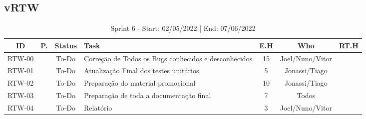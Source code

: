 \subsection{vRTW}

\begin{table}[h]
    \centering
    \begin{tabular}{|c|c|c| m{18em} |c|c|c|}
        \hline
        ID & P. & Status & Task & E.H & Who & RT.H \\
        \hline                               %
        RTW-00 & & To-Do & Correção de Todos os Bugs conhecidos e desconhecidos & 15 & Joel/Nuno/Vitor & \\
        RTW-01 & & To-Do & Atualização Final dos testes unitários & 5 & Jonassi/Tiago & \\
        RTW-02 & & To-Do & Preparação do material promocional & 10 & Jonassi/Tiago & \\
        RTW-03 & & To-Do & Preparação de toda a documentação final & 7 & Todos & \\
        RTW-04 & & To-Do & Relatório & 3 & Joel/Nuno/Vitor &  \\
        \hline 
    \end{tabular}
    \caption{Sprint 6 - Start: 02/05/2022 | End: 07/06/2022}
\end{table}
\newpage





